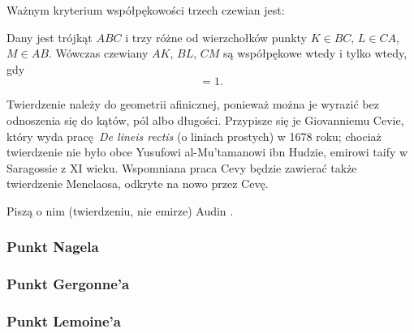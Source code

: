 %

Ważnym kryterium współpękowości trzech czewian jest:

\begin{theorem}[Cevy]
	Dany jest trójkąt $ABC$ i trzy różne od wierzchołków punkty $K \in BC$, $L \in CA$, $M \in AB$.
	Wówczas czewiany $AK$, $BL$, $CM$ są współpękowe wtedy i tylko wtedy, gdy
	\begin{equation}
		[AMB] [BKC] [CLA] = 1.
	\end{equation}
\end{theorem}

Twierdzenie należy do geometrii afinicznej, ponieważ można je wyrazić bez odnoszenia się do kątów, pól albo długości.
Przypisze się je Giovanniemu Cevie, który wyda pracę \emph{De lineis rectis} (o liniach prostych) w 1678 roku; chociaż twierdzenie nie było obce Yusufowi al-Mu'tamanowi ibn Hudzie, emirowi taify w Saragossie z XI wieku.
%
%
Wspomniana praca Cevy będzie zawierać także twierdzenie Menelaosa, odkryte na nowo przez Cevę.

Piszą o nim (twierdzeniu, nie emirze) Audin \cite[s. 38]{audin_2003}.

\begin{proposition}
\end{proposition}

\subsubsection{Punkt Nagela}

\subsubsection{Punkt Gergonne'a}


\subsubsection{Punkt Lemoine'a}




%